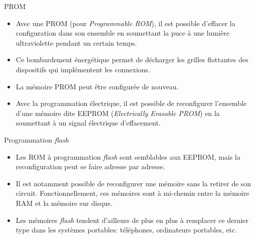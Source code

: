 \documentclass[presentation]{beamer}
\begin{document}
\begin{frame}[label={sec:orgb3abdaf}]{PROM}
\begin{itemize}
\item Avec une \alert{PROM} (pour \emph{Programmable ROM}), il est possible d'effacer la configuration dans son ensemble en soumettant la puce à une lumière ultraviolette pendant un certain temps.

\item Ce bombardement énergétique permet de décharger les grilles flottantes des dispositifs qui implémentent les connexions.

\item La mémoire PROM peut être configurée de nouveau.

\item Avec la \alert{programmation électrique}, il est possible de reconfigurer l'ensemble d'une mémoire dite EEPROM (\emph{Electrically Erasable PROM}) en la soumettant à un signal électrique d'effacement.
\end{itemize}
\end{frame}

\begin{frame}[label={sec:orgeb8ebff}]{Programmation \emph{flash}}
\begin{itemize}
\item Les ROM à \alert{programmation \emph{flash}} sont semblables aux EEPROM, mais la reconfiguration peut se faire adresse par adresse.

\item Il est notamment possible de reconfigurer une mémoire sans la retirer de son circuit.  Fonctionnellement, ces mémoires sont à mi-chemin entre la mémoire RAM et la mémoire sur disque.

\item Les mémoires \emph{flash} tendent d'ailleurs de plus en plus à remplacer ce dernier type dans les systèmes portables: téléphones, ordinateurs portables, etc.
\end{itemize}
\end{frame}
\end{document}
